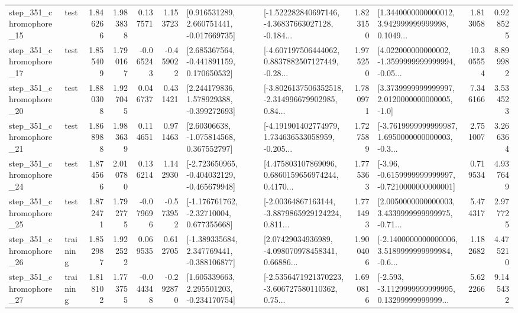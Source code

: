 \begin{tabular}{llrrrrllrlrr}
  step\_351\_chromophore\_15 &      test &      1.846266 &    1.983838 &      0.137571 &  1.153723 &    [0.916531289, 2.660751441, -0.017669735] &  [-1.522282840697146, -4.36837663027128, -0.184... &       1.823150 &  [1.3440000000000012, 3.942999999999998, 0.1049... &            1.813058 &          0.928525 \\
  step\_351\_chromophore\_17 &      test &      1.855409 &    1.790167 &     -0.065243 & -0.459022 &    [2.685367564, -0.441891159, 0.170650532] &  [-4.607197506444062, 0.8837882507127449, -0.28... &       1.975250 &  [4.022000000000002, -1.3599999999999994, -0.05... &           10.305554 &          8.899982 \\
  step\_351\_chromophore\_20 &      test &      1.880308 &    1.927045 &      0.046737 &  0.431421 &    [2.244179836, 1.578929388, -0.399272693] &  [-3.8026137506352518, -2.314996679902985, 0.84... &       1.780971 &     [3.3739999999999997, 2.0120000000000005, -1.0] &            7.346166 &          3.534523 \\
  step\_351\_chromophore\_21 &      test &      1.868988 &    1.983639 &      0.114651 &  0.971463 &     [2.60306638, -1.075814568, 0.367552797] &  [-4.191901402774979, 1.734636533058959, -0.205... &       1.727589 &  [-3.7619999999999987, 1.6950000000000003, -0.3... &            2.751007 &          3.266364 \\
  step\_351\_chromophore\_24 &      test &      1.874566 &    2.010780 &      0.136214 &  1.142930 &  [-2.723650965, -0.404032129, -0.465679948] &  [4.475803107869096, 0.6860159656974244, 0.4170... &       1.775363 &  [-3.96, -0.6159999999999997, -0.7210000000000001] &            0.719534 &          4.937649 \\
  step\_351\_chromophore\_25 &      test &      1.872471 &    1.792775 &     -0.079696 & -0.573952 &    [-1.176761762, -2.32710004, 0.677355668] &  [-2.00364867163144, -3.8879865929124224, 0.811... &       1.771493 &  [2.0050000000000003, 3.4339999999999975, -0.71... &            5.474317 &          2.977725 \\
  step\_351\_chromophore\_26 &  training &      1.852987 &    1.922522 &      0.069535 &  0.612705 &   [-1.389335684, 2.347769441, -0.388106877] &  [2.07429034936989, -4.098070978458341, 0.66886... &       1.900406 &  [-2.1400000000000006, 3.5189999999999984, -0.6... &            1.182682 &          4.475210 \\
  step\_351\_chromophore\_27 &  training &      1.818102 &    1.773755 &     -0.044348 & -0.292870 &    [1.605339663, 2.295501203, -0.234170754] &  [-2.5356471921370223, -3.606727580110362, 0.75... &       1.690816 &  [-2.593, -3.1129999999999995, 0.13299999999999... &            5.622266 &          9.145432 \\

\end{tabular}
